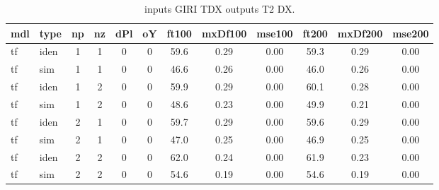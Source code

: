 \begin{center} 
\begin{longtable}{ll|cccc|ccc|ccc} 
\caption[inputs GIRI TDX   outputs T2 DX]{inputs GIRI TDX   outputs T2 DX.} 
\label{tab:inputs_GIRI_TDX___outputs_T2_DX} 
\hline 
  mdl & type & np & nz & dPl & oY & ft100 & mxDf100 & mse100 & ft200 & mxDf200 & mse200 \\ 
 \hline 
tf  & iden & 1 & 1 & 0 & 0 & 59.6 & 0.29 & 0.00 & 59.3 & 0.29 & 0.00 \\ 
tf  & sim & 1 & 1 & 0 & 0 & 46.6 & 0.26 & 0.00 & 46.0 & 0.26 & 0.00 \\ 
 \hline 
tf  & iden & 1 & 2 & 0 & 0 & 59.9 & 0.29 & 0.00 & 60.1 & 0.28 & 0.00 \\ 
tf  & sim & 1 & 2 & 0 & 0 & 48.6 & 0.23 & 0.00 & 49.9 & 0.21 & 0.00 \\ 
 \hline 
tf  & iden & 2 & 1 & 0 & 0 & 59.7 & 0.29 & 0.00 & 59.6 & 0.29 & 0.00 \\ 
tf  & sim & 2 & 1 & 0 & 0 & 47.0 & 0.25 & 0.00 & 46.9 & 0.25 & 0.00 \\ 
 \hline 
tf  & iden & 2 & 2 & 0 & 0 & 62.0 & 0.24 & 0.00 & 61.9 & 0.23 & 0.00 \\ 
tf  & sim & 2 & 2 & 0 & 0 & 54.6 & 0.19 & 0.00 & 54.6 & 0.19 & 0.00 \\ 
 \hline 
\end{longtable} 
\end{center}